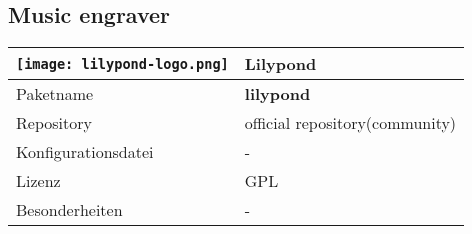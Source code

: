 \subsection{Music engraver}
\begin{tabular}{l|l}
\texttt{[image: lilypond-logo.png]} & Lilypond \\ \hline
Paketname & \textbf{lilypond} \\ 
Repository & official repository(community) \\
Konfigurationsdatei & - \\
Lizenz & GPL \\
Besonderheiten & - \\
\end{tabular}
